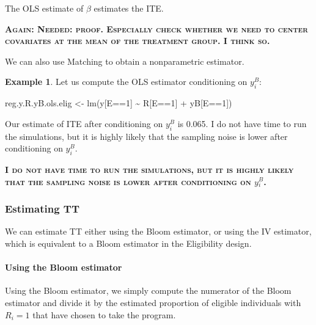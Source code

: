 \documentclass[
]{book}
\newenvironment{Shaded}{\begin{snugshade}}{\end{snugshade}}
\newcommand{\DecValTok}[1]{\textcolor[rgb]{0.00,0.00,0.81}{#1}}
\newcommand{\FunctionTok}[1]{\textcolor[rgb]{0.00,0.00,0.00}{#1}}
\newcommand{\NormalTok}[1]{#1}
\newcommand{\OtherTok}[1]{\textcolor[rgb]{0.56,0.35,0.01}{#1}}
\newcommand{\SpecialCharTok}[1]{\textcolor[rgb]{0.00,0.00,0.00}{#1}}
\theoremstyle{definition}
\theoremstyle{definition}
\newtheorem{example}{Example}[chapter]
\theoremstyle{definition}
\theoremstyle{definition}
\theoremstyle{remark}
\begin{document}
The OLS estimate of \(\beta\) estimates the ITE.

\textbf{\textsc{Again: Needed: proof. Especially check whether we need to center covariates at the mean of the treatment group. I think so.}}

We can also use Matching to obtain a nonparametric estimator.

\begin{example}
\protect\hypertarget{exm:unnamed-chunk-96}{}{\label{exm:unnamed-chunk-96} }Let us compute the OLS estimator conditioning on \(y_i^B\):
\end{example}

\begin{Shaded}
\begin{Highlighting}[]
\NormalTok{reg.y.R.yB.ols.elig }\OtherTok{\textless{}{-}} \FunctionTok{lm}\NormalTok{(y[E}\SpecialCharTok{==}\DecValTok{1}\NormalTok{] }\SpecialCharTok{\textasciitilde{}}\NormalTok{ R[E}\SpecialCharTok{==}\DecValTok{1}\NormalTok{] }\SpecialCharTok{+}\NormalTok{ yB[E}\SpecialCharTok{==}\DecValTok{1}\NormalTok{])}
\end{Highlighting}
\end{Shaded}

Our estimate of ITE after conditioning on \(y_i^B\) is 0.065.
I do not have time to run the simulations, but it is highly likely that the sampling noise is lower after conditioning on \(y_i^B\).

\textbf{\textsc{I do not have time to run the simulations, but it is highly likely that the sampling noise is lower after conditioning on \(y_i^B\).}}

\hypertarget{estimating-tt-1}{%
\subsubsection{Estimating TT}\label{estimating-tt-1}}

We can estimate TT either using the Bloom estimator, or using the IV estimator, which is equivalent to a Bloom estimator in the Eligibility design.

\hypertarget{using-the-bloom-estimator}{%
\paragraph{Using the Bloom estimator}\label{using-the-bloom-estimator}}

Using the Bloom estimator, we simply compute the numerator of the Bloom estimator and divide it by the estimated proportion of eligible individuals with \(R_i=1\) that have chosen to take the program.
\end{document}
